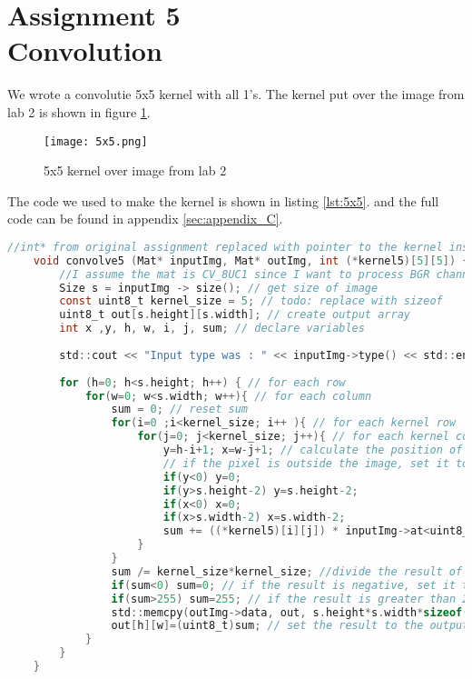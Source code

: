 \section {Assignment 5 \\ {Convolution}}
\label {sec:assignment_5}

We wrote a convolutie 5x5 kernel with all 1's. The kernel put over the image from lab 2 is shown in figure \ref{fig:5x5}.

\begin{figure}[h!]
    \centering
    \texttt{[image: 5x5.png]}
    \caption{5x5 kernel over image from lab 2}
    \label{fig:5x5}
\end{figure}

The code we used to make the kernel is shown in listing \ref{lst:5x5}. and the full code can be found in appendix \ref{sec:appendix_C}.

\begin{lstlisting}[language=C, caption=5x5 kernel, label=lst:5x5]
    //int* from original assignment replaced with pointer to the kernel instead, because that makes more sense
    void convolve5 (Mat* inputImg, Mat* outImg, int (*kernel5)[5][5]) { 
        //I assume the mat is CV_8UC1 since I want to process BGR channels individually
        Size s = inputImg -> size(); // get size of image
        const uint8_t kernel_size = 5; // todo: replace with sizeof
        uint8_t out[s.height][s.width]; // create output array
        int x ,y, h, w, i, j, sum; // declare variables
        
        std::cout << "Input type was : " << inputImg->type() << std::endl; //debug
      
        for (h=0; h<s.height; h++) { // for each row
            for(w=0; w<s.width; w++){ // for each column
                sum = 0; // reset sum
                for(i=0 ;i<kernel_size; i++ ){ // for each kernel row
                    for(j=0; j<kernel_size; j++){ // for each kernel column
                        y=h-i+1; x=w-j+1; // calculate the position of the pixel in the image
                        // if the pixel is outside the image, set it to the border
                        if(y<0) y=0;
                        if(y>s.height-2) y=s.height-2; 
                        if(x<0) x=0;
                        if(x>s.width-2) x=s.width-2;
                        sum += ((*kernel5)[i][j]) * inputImg->at<uint8_t>(y,x); // add the product of the kernel and the pixel to the sum
                    }
                }
                sum /= kernel_size*kernel_size; //divide the result of the pixel by 5^2
                if(sum<0) sum=0; // if the result is negative, set it to 0
                if(sum>255) sum=255; // if the result is greater than 255, set it to 255
                std::memcpy(outImg->data, out, s.height*s.width*sizeof(uint8_t)); // copy the result to the output array
                out[h][w]=(uint8_t)sum; // set the result to the output array
            }
        }
    }
    
\end{lstlisting}
